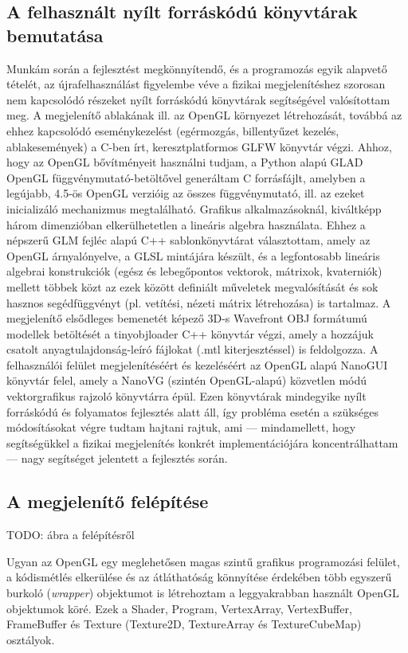 \subsection{A felhasznált nyílt forráskódú könyvtárak bemutatása}

Munkám során a fejlesztést megkönnyítendő, és a programozás egyik alapvető tételét, az újrafelhasználást figyelembe véve a fizikai megjelenítéshez szorosan nem kapcsolódó részeket nyílt forráskódú könyvtárak segítségével valósítottam meg. A megjelenítő ablakának ill. az OpenGL környezet létrehozását, továbbá az ehhez kapcsolódó eseménykezelést (egérmozgás, billentyűzet kezelés, ablakesemények) a C-ben írt, keresztplatformos GLFW könyvtár végzi. Ahhoz, hogy az OpenGL bővítményeit használni tudjam, a Python alapú GLAD OpenGL függvénymutató-betöltővel generáltam C forrásfájlt, amelyben a legújabb, 4.5-ös OpenGL verzióig az összes függvénymutató, ill. az ezeket inicializáló mechanizmus megtalálható. Grafikus alkalmazásoknál, kiváltképp három dimenzióban elkerülhetetlen a lineáris algebra használata. Ehhez a népszerű GLM fejléc alapú C++ sablonkönyvtárat választottam, amely az OpenGL árnyalónyelve, a GLSL mintájára készült, és a legfontosabb lineáris algebrai konstrukciók (egész és lebegőpontos vektorok, mátrixok, kvaterniók) mellett többek közt az ezek között definiált műveletek megvalósítását és sok hasznos segédfüggvényt (pl. vetítési, nézeti mátrix létrehozása) is tartalmaz. A megjelenítő elsődleges bemenetét képező 3D-s Wavefront OBJ formátumú modellek betöltését a tinyobjloader C++ könyvtár végzi, amely a hozzájuk csatolt anyagtulajdonság-leíró fájlokat (.mtl kiterjesztéssel) is feldolgozza. A felhasználói felület megjelenítéséért és kezeléséért az OpenGL alapú NanoGUI könyvtár felel, amely a NanoVG (szintén OpenGL-alapú) közvetlen módú vektorgrafikus rajzoló könyvtárra épül. Ezen könyvtárak mindegyike nyílt forráskódú és folyamatos fejlesztés alatt áll, így probléma esetén a szükséges módosításokat végre tudtam hajtani rajtuk, ami --- mindamellett, hogy segítségükkel a fizikai megjelenítés konkrét implementációjára koncentrálhattam --- nagy segítséget jelentett a fejlesztés során.

\subsection{A megjelenítő felépítése}

TODO: ábra a felépítésről

Ugyan az OpenGL egy meglehetősen magas szintű grafikus programozási felület, a kódismétlés elkerülése és az átláthatóság könnyítése érdekében több egyszerű burkoló (\textit{wrapper}) objektumot is létrehoztam a leggyakrabban használt OpenGL objektumok köré. Ezek a Shader, Program, VertexArray, VertexBuffer, FrameBuffer és Texture (Texture2D, TextureArray és TextureCubeMap) osztályok.

